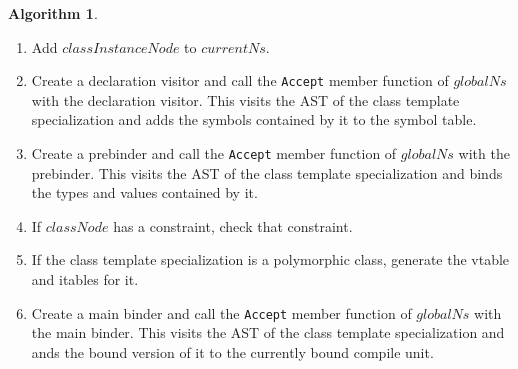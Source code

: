 \documentclass[a4paper,oneside,11pt]{book}
\theoremstyle{definition}
\newtheorem{algo}{Algorithm}[section]
\begin{document}
\begin{algo}
\begin{enumerate}
\begin{enumerate}
\item
Otherwise,
\begin{enumerate}
\item
If $i \ge $ number of template parameter nodes contained by $node$, report error "too few template arguments" and exit.
\item
Let $templateParameterNode$ be the $i$'th template parameter nodes of $classNode$.
\item
Let $defaultTemplateArgumentNode$ be the default template argument of $templateParameterNode$.
\item
If $defaultTemplateArgumentNode$ is null, report error "too few template arguments" and exit.
\item
Set $typeArgument$ to the type resolved using algorithm \ref{resolvetype} with\\
$defaultTemplateArgumentNode$.
\item
Add $typeArgument$ to the type arguments of the class template specialization symbol.
\end{enumerate}
\item
Set type of $boundTypeParam$ to $typeArgument$.
\item
Add $boundTypeParam$ as the member of the class template specialization symbol
so that it is found by the type resolver when binding the class template specialization.
The $boundTypeParam$ will map a name of a template parameter to the corresponding template argument symbol.
\end{enumerate}
\item
Add $classInstanceNode$ to $currentNs$.
\item
Create a declaration visitor and call the \verb|Accept| member function of $globalNs$ with the declaration visitor.
This visits the AST of the class template specialization and adds the symbols contained by it to the symbol table.
\item
Create a prebinder and call the \verb|Accept| member function of $globalNs$ with the prebinder.
This visits the AST of the class template specialization and binds the types and values contained by it.
\item
If $classNode$ has a constraint, check that constraint.
\item
If the class template specialization is a polymorphic class, generate the vtable and itables for it.
\item
Create a main binder and call the \verb|Accept| member function of $globalNs$ with the main binder.
This visits the AST of the class template specialization and ands the bound version of it to the currently bound compile unit.
\end{enumerate}
\end{algo}
\end{document}
